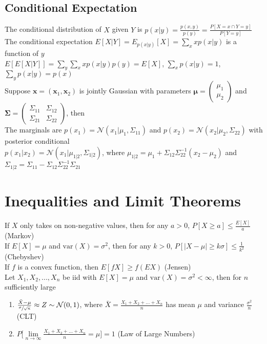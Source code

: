 \documentclass{article}
\newcommand{\V}{\mbox{var}}
\begin{document}
\subsection{Conditional Expectation}
The conditional distribution of $X$ given $Y$ is $p(x|y) = \frac{p(x,y)}{p(y)} = \frac{P[X=x \cap Y = y]}{P[Y=y]}$ \\
The conditional expectation $E[X|Y] = E_{p(x|y)}[X] = \sum_x xp(x|y)$ is a function of $y$ \\
$E[E[X|Y]] = \sum_y\sum_x xp(x|y)p(y) = E[X]$, $\sum_x p(x|y) = 1$, $\sum_yp(x|y) = p(x)$ \\
Suppose $\boldsymbol x = (\boldsymbol x_1, \boldsymbol x_2)$ is jointly Gaussian with parameters $\boldsymbol \mu = \begin{pmatrix} \mu_1\\ \mu_2 \end{pmatrix}$ and $\boldsymbol \Sigma = \begin{pmatrix} \Sigma_{11} & \Sigma_{12} \\ \Sigma_{21} & \Sigma_{22} \end{pmatrix}$, then \\
The marginals are $p(x_1) = \mathcal{N}(x_1 | \mu_1, \Sigma_{11})$ and $p(x_2) = \mathcal{N}(x_2 | \mu_2, \Sigma_{22})$ with posterior conditional \\
$p(x_1 | x_2) = \mathcal{N}(x_1 | \mu_{1|2}, \Sigma_{1|2})$, where $\mu_{1|2} = \mu_1 + \Sigma_{12} \Sigma_{22}^{-1}(x_2 - \mu_2)$ and $ \Sigma_{1|2} = \Sigma_{11} - \Sigma_{12} \Sigma_{22}^{-1} \Sigma_{21}$

\section{Inequalities and Limit Theorems}
If $X$ only takes on non-negative values, then for any $a > 0$, $P[X \geq a] \leq \frac{E[X]}{a}$  (Markov)\\
If $E[X] = \mu$ and $\V(X) = \sigma^2$, then for any $k > 0$, $P[|X - \mu| \geq k \sigma] \leq \frac{1}{k^2}$ (Chebyshev) \\
If $f$ is a convex function, then $E[fX] \geq f(E X)$ (Jensen) \\
Let $X_1, X_2, ..., X_n$ be iid with $E[X] = \mu$ and $\V(X) = \sigma^2 < \infty$, then for $n$ sufficiently large 
\begin{enumerate}
\item $\frac{\bar{X} - \mu}{\sfrac{\sigma}{\sqrt{n}}} \approx Z \sim \mathcal{N}(0, 1)$, where $\bar{X} = \frac{X_1 + X_2 + ... + X_n}{n}$ has mean $\mu$ and variance $\frac{\sigma^2}{n}$ (CLT)
\item $P\Big[\lim\limits_{n\to \infty} \frac{X_1 + X_2 + ... + X_n}{n} = \mu \Big] = 1$ (Law of Large Numbers)
\end{enumerate}
\end{document}
